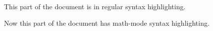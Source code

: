 \documentclass{article}
\begin{document}
This part of the document is in regular syntax highlighting.


Now this part of the document has math-mode syntax highlighting.

\end{document}

